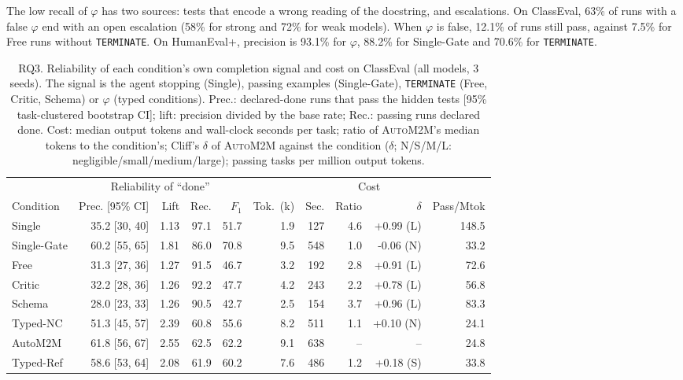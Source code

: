 \documentclass[pdflatex,sn-mathphys-num]{sn-jnl}
\theoremstyle{thmstyleone}%
\theoremstyle{thmstyletwo}%
\theoremstyle{thmstylethree}%
\newcommand{\auto}{\textsc{AutoM2M}}
\newcommand{\code}[1]{\texttt{#1}}
\begin{document}
The low recall of $\varphi$ has two sources: tests that encode a wrong reading
of the docstring, and escalations. On ClassEval, 63\% of runs with a false
$\varphi$ end with an open escalation (58\% for strong and 72\% for weak
models). When $\varphi$ is false, 12.1\% of runs still pass, against 7.5\% for
Free runs without \code{TERMINATE}. On HumanEval+, precision is 93.1\% for
$\varphi$, 88.2\% for Single-Gate and 70.6\% for \code{TERMINATE}.

\begin{table}[t]
\centering\scriptsize
\caption{RQ3. Reliability of each condition's own completion signal and cost on
ClassEval (all models, 3 seeds). The signal is the agent stopping (Single),
passing examples (Single-Gate), \code{TERMINATE} (Free, Critic, Schema) or
$\varphi$ (typed conditions). Prec.: declared-done runs that pass the hidden
tests [95\% task-clustered bootstrap CI]; lift: precision divided by the base rate; Rec.: passing runs declared
done. Cost: median output tokens and wall-clock seconds per task; ratio of
\auto{}'s median tokens to the condition's; Cliff's $\delta$ of \auto{} against
the condition ($\delta$; N/S/M/L: negligible/small/medium/large); passing
tasks per million output tokens.}
\label{tab:done}
\setlength{\tabcolsep}{2.2pt}
\begin{tabular}{@{}l r r r r r r r r r@{}}
\toprule
& \multicolumn{4}{c}{Reliability of ``done''} & \multicolumn{5}{c}{Cost} \\
\cmidrule(lr){2-5}\cmidrule(l){6-10}
Condition & Prec. [95\% CI] & Lift & Rec. & $F_1$ & Tok.\ (k) & Sec. & Ratio & $\delta$ & Pass/Mtok \\
\midrule
Single & 35.2 [30, 40] & 1.13 & 97.1 & 51.7 & 1.9 & 127 & 4.6 & +0.99 (L) & 148.5 \\
Single-Gate & 60.2 [55, 65] & 1.81 & 86.0 & 70.8 & 9.5 & 548 & 1.0 & -0.06 (N) & 33.2 \\
Free & 31.3 [27, 36] & 1.27 & 91.5 & 46.7 & 3.2 & 192 & 2.8 & +0.91 (L) & 72.6 \\
Critic & 32.2 [28, 36] & 1.26 & 92.2 & 47.7 & 4.2 & 243 & 2.2 & +0.78 (L) & 56.8 \\
Schema & 28.0 [23, 33] & 1.26 & 90.5 & 42.7 & 2.5 & 154 & 3.7 & +0.96 (L) & 83.3 \\
Typed-NC & 51.3 [45, 57] & 2.39 & 60.8 & 55.6 & 8.2 & 511 & 1.1 & +0.10 (N) & 24.1 \\
AutoM2M & 61.8 [56, 67] & 2.55 & 62.5 & 62.2 & 9.1 & 638 & -- & -- & 24.8 \\
Typed-Ref & 58.6 [53, 64] & 2.08 & 61.9 & 60.2 & 7.6 & 486 & 1.2 & +0.18 (S) & 33.8 \\
\bottomrule
\end{tabular}
\end{table}
\end{document}
